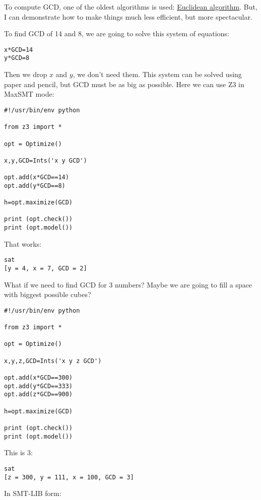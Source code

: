 To compute GCD, one of the oldest algorithms is used: \href{https://en.wikipedia.org/wiki/Euclidean_algorithm}{Euclidean algorithm}.
But, I can demonstrate how to make things much less efficient, but more spectacular.

To find GCD of 14 and 8, we are going to solve this system of equations:

\begin{lstlisting}
x*GCD=14
y*GCD=8
\end{lstlisting}

Then we drop $x$ and $y$, we don't need them.
This system can be solved using paper and pencil, but GCD must be as big as possible.
Here we can use Z3 in MaxSMT mode:

\begin{lstlisting}
#!/usr/bin/env python

from z3 import *

opt = Optimize()

x,y,GCD=Ints('x y GCD')

opt.add(x*GCD==14)
opt.add(y*GCD==8)

h=opt.maximize(GCD)

print (opt.check())
print (opt.model())
\end{lstlisting}

That works:

\begin{lstlisting}
sat
[y = 4, x = 7, GCD = 2]
\end{lstlisting}

What if we need to find GCD for 3 numbers?
Maybe we are going to fill a space with biggest possible cubes?

\begin{lstlisting}
#!/usr/bin/env python

from z3 import *

opt = Optimize()

x,y,z,GCD=Ints('x y z GCD')

opt.add(x*GCD==300)
opt.add(y*GCD==333)
opt.add(z*GCD==900)

h=opt.maximize(GCD)

print (opt.check())
print (opt.model())
\end{lstlisting}

This is 3:

\begin{lstlisting}
sat
[z = 300, y = 111, x = 100, GCD = 3]
\end{lstlisting}

In SMT-LIB form:



